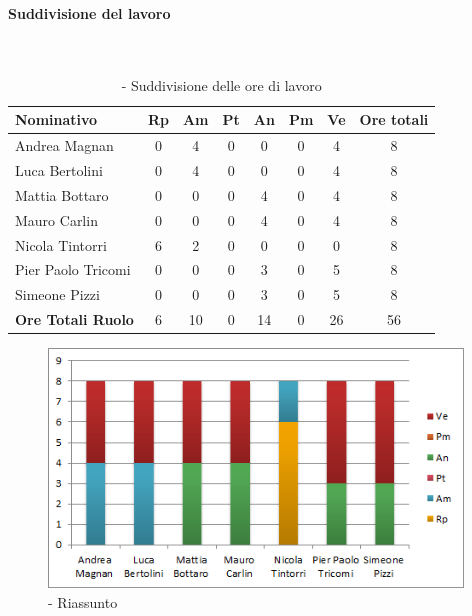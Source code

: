 \documentclass[../PianoDiProgetto.tex]{subfiles}
\begin{document}
\vspace{20 mm}
	
	\subsubsection{\PerAD}
				\paragraph{Suddivisione del lavoro}\
				
	\begin{table}[H]
		\begin{tabularx}{\textwidth}{l  * {6}{c}  c}
			\toprule
			\textbf{Nominativo} & \textbf{Rp} & \textbf{Am} & \textbf{Pt} 
						& \textbf{An} & \textbf{Pm} & \textbf{Ve} & \textbf{Ore totali} \\
			\midrule
			Andrea Magnan & 0 & 4 &	0 &	0 & 0 & 4 & 8 \\
			Luca Bertolini & 0 & 4 & 0 & 0 & 0 & 4 & 8 \\
			Mattia Bottaro & 0 & 0 & 0 & 4 & 0 & 4 & 8 \\
			Mauro Carlin & 0 & 0 &	0 &	4 & 0 & 4 & 8 \\
			Nicola Tintorri &	6 & 2 & 0 & 0 & 0 & 0 & 8 \\
			Pier Paolo Tricomi & 0 & 0 &	0 &	3 & 0 & 5 & 8 \\
			Simeone Pizzi & 0 & 0 & 0 & 3 & 0 & 5 & 8 \\
			\midrule			
			\textbf{Ore Totali Ruolo} & 6 & 10 & 0 & 14 & 0 & 26 & 56 \\
			\bottomrule
		\end{tabularx}	
		\caption{\PerAD{} - Suddivisione delle ore di lavoro}
	\end{table}
\newpage

	\vspace{15 mm}	
	
	
	\begin{figure}[H]
		\centering
		\includegraphics[width=11cm, trim=1cm 0cm 1cm 0cm]{grafici/AD-persona}
			\caption{\PerAD{} - Riassunto}
	\end{figure}
	
\end{document}
